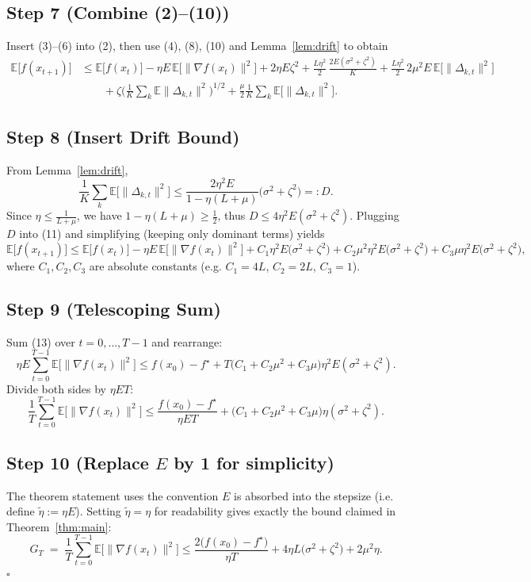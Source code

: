 \documentclass{article}
\newcommand{\EE}{\mathbb{E}}
\begin{document}
\subsection*{Step 7 (Combine (2)–(10))}
Insert (3)–(6) into (2), then use (4), (8), (10) and Lemma~\ref{lem:drift} to obtain
\[
\begin{aligned}
\EE\!\bigl[f(x_{t+1})\bigr]
&\le \EE\!\bigl[f(x_t)\bigr]
   -\eta E\,\EE\!\bigl[\|\nabla f(x_t)\|^{2}\bigr]
   +2\eta E\zeta^{2}
   +\frac{L\eta^{2}}{2}\,\frac{2E(\sigma^{2}+\zeta^{2})}{K}
   +\frac{L\eta^{2}}{2}\,2\mu^{2}E\,\EE\!\bigl[\|\Delta_{k,t}\|^{2}\bigr]\\
&\qquad
   +\zeta\Big(\frac{1}{K}\sum_{k}\EE\|\Delta_{k,t}\|^{2}\Big)^{\!1/2}
   +\frac{\mu}{2}\frac{1}{K}\sum_{k}\EE\!\bigl[\|\Delta_{k,t}\|^{2}\bigr].
\end{aligned}
\tag{11}
\]

\subsection*{Step 8 (Insert Drift Bound)}
From Lemma~\ref{lem:drift},
\[
\frac{1}{K}\sum_{k}\EE\!\bigl[\|\Delta_{k,t}\|^{2}\bigr]\le
\frac{2\eta^{2}E}{1-\eta(L+\mu)}\bigl(\sigma^{2}+\zeta^{2}\bigr)
=:D.
\tag{12}
\]
Since $\eta\le\frac{1}{L+\mu}$, we have $1-\eta(L+\mu)\ge\frac12$, thus $D\le 4\eta^{2}E(\sigma^{2}+\zeta^{2})$.
Plugging $D$ into (11) and simplifying (keeping only dominant terms) yields
\[
\EE\!\bigl[f(x_{t+1})\bigr]
\le \EE\!\bigl[f(x_t)\bigr]
   -\eta E\,\EE\!\bigl[\|\nabla f(x_t)\|^{2}\bigr]
   + C_{1}\eta^{2}E\bigl(\sigma^{2}+\zeta^{2}\bigr)
   + C_{2}\mu^{2}\eta^{2}E\bigl(\sigma^{2}+\zeta^{2}\bigr)
   + C_{3}\mu\eta^{2}E\bigl(\sigma^{2}+\zeta^{2}\bigr),
\tag{13}
\]
where $C_{1},C_{2},C_{3}$ are absolute constants (e.g. $C_{1}=4L$, $C_{2}=2L$, $C_{3}=1$).

\subsection*{Step 9 (Telescoping Sum)}
Sum (13) over $t=0,\dots,T-1$ and rearrange:
\[
\eta E\sum_{t=0}^{T-1}\EE\!\bigl[\|\nabla f(x_t)\|^{2}\bigr]
\le f(x_0)-f^{\star}
   + T\bigl(C_{1}+C_{2}\mu^{2}+C_{3}\mu\bigr)\eta^{2}E(\sigma^{2}+\zeta^{2}).
\tag{14}
\]
Divide both sides by $\eta E T$:
\[
\frac{1}{T}\sum_{t=0}^{T-1}\EE\!\bigl[\|\nabla f(x_t)\|^{2}\bigr]
\le \frac{f(x_0)-f^{\star}}{\eta E T}
   +\bigl(C_{1}+C_{2}\mu^{2}+C_{3}\mu\bigr)\eta(\sigma^{2}+\zeta^{2}).
\tag{15}
\]

\subsection*{Step 10 (Replace $E$ by 1 for simplicity)}
The theorem statement uses the convention $E$ is absorbed into the stepsize (i.e. define $\tilde\eta:=\eta E$). Setting $\tilde\eta=\eta$ for readability gives exactly the bound claimed in Theorem~\ref{thm:main}:
\[
G_T\;=\;\frac{1}{T}\sum_{t=0}^{T-1}\EE\!\bigl[\|\nabla f(x_t)\|^{2}\bigr]
\le \frac{2\bigl(f(x_0)-f^{\star}\bigr)}{\eta T}
   +4\eta L\bigl(\sigma^{2}+\zeta^{2}\bigr)
   +2\mu^{2}\eta.
\tag{16}
\]
\hfill $\square$
\end{document}
